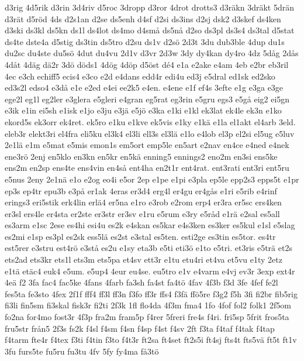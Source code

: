 {{d3rig
4d5rik
d3rin
3d4riv
d5roc
3dropp
d3ror
4drot
drotts3
d3r^^e4kn
3dr^^e4kt
5dr^^e4n
d3r^^e4t
d5r^^f6d
4ds
d2s1an
d2se
ds5enh
d4sf
d2si
ds3ins
d2sj
dsk2
d3skef
ds4ken
d3ski
ds3kl
ds5kn
ds1l
ds4lot
ds4mo
d4sm^^e5
ds5n^^e5
d2so
ds3pl
ds3s4
ds3tal
d5stat
ds4te
dste4a
d5stig
ds3tin
ds5tro
d2su
ds1v
d2s^^f6
2d3t
3du
dub3ble
4dup
du1s
du2sc
du4ste
du5s^^f6
4dut
du4vu
2d1v
d3vr
2d3w
3dy
dy4kan
dy4ro
4dz
5d^^e5g
2d^^e5s
4d^^e5t
4d^^e4g
d^^e42r
3d^^f6
d^^f6ds1
4d^^f6g
4d^^f6p
d5^^f6st
d^^e94
e1a
e2ake
e4am
4eb
e2br
eb3ril
4ec
e3ch
echiff5
ecis4
e3co
e2d
e4dans
edd4r
edi4u
ed3j
e5dral
ed1sk
ed2sko
ed3s2l
edso4
e3d^^e5
e1e
e2ed
e4ei
ee2k5
e4en.
e4ene
e1f
ef4s
3efte
e1g
e3ga
e3ge
ege2l
eg1l
eg2ler
e3glera
e5gleri
e4gran
eg5rat
eg3rin
e5gru
egs3
e5g^^e5
eig2
ei5gn
e3ik
e1in
ei5sh
e1isk
e1jo
e3ju
e3j^^e4
e5j^^f6
e3ka
e1ki
e1kl
ek3lat
ek4le
ek3n
e1ko
ekord5s
ek3orr
ek4ret.
ek5ro
e1ku
e1kve
ek5vis
e1ky
e1k^^e4
e1la
el1akt
el4arb
3eld.
eleb3r
elekt3ri
el4fra
eli5ku
el3k4
el3li
ell3s
el3l^^e4
e1lo
e4lob
el3p
el2si
el5ug
e5luv
2e1l^^e4
e1m
e5mat
e5mis
emon1s
em5ort
emp5le
en5art
e2nav
en4ce
e4ned
e4nek
ene3r^^f6
2enj
en5klo
en3kn
en5kr
en5k^^e4
enning5
ennings2
eno2m
en3si
ens5ke
ens2m
en2sp
ens4te
ens4vin
en4s^^e5
ent4ha
en2t1r
ent4rat.
ent3rati
ent3ri
ent5ru
e5nus
2eny
2e1n^^e4
e1o
e2og
eo4i
e5or
2ep
e1pe
e1pi
e3pla
ep5le
epp2s3
epps5t
e1pr
ep3s
ep4tr
epu3b
e3p^^e5
er1ak
4eras
er3d4
erg4l
er4gu
er4g^^e5s
e1ri
e5rib
e4rinf
erings3
eri5stik
erk4lin
erl^^e44
er5na
e1ro
e3rob
e2rom
erp4
er3ra
er5sc
ers4ken
er3sl
ers4le
er4sta
er2ste
er3str
er3sv
e1ru
e5rum
e3ry
e5r^^e5d
e1r^^e4
e2sal
es5all
es3arm
e1sc
2ese
es4hi
esi4u
es2k
e4skan
es5kar
e4s3ken
es3ker
es5kul
e1sl
e5slag
es2mi
e1sp
es3pl
es2sk
ess5l^^e4
es2st
e3stal
es5ten.
esti2ge
es3tin
es5tor.
es4tr
est5rer
e3stru
est4r^^f6
e3st^^e5
es2u
e1sy
eta3b
e5ti
eti3^^f6
e1to
e5tri.
et3ris
e5tr^^e4
et2s
ets2ad
ets3kr
ets1l
ets3m
ets5pa
et4sv
ett3r
e1tu
etu4ri
et4va
et5vu
e1ty
2etz
e1t^^e4
et^^e4c4
euk4
e5um.
e5up4
4eur
eu4se.
eu5tro
e1v
e4varm
e4vj
ev3r
3exp
ext4r
4e^^e4
f2
3fa
fac4
fac5ke
4fans
4farb
fa3sh
fa4st
fa4t^^f6
4fav
4f3b
f3d
3fe
4fef
fe2l
fes5ta
fe3sto
4fex
2f1f
fff4
ff3l
ff3n
f3fo
ff3r
ffs4
f3f^^e4
ff^^f65re
f3g2
f5h
3fi
fi2br
fib5rig
fi3li
fin5sm
fi3skal
fisk3r
fi2ti
2f3k
1fl
flo4da
4f3m
fma4
1fo
4fof
fol2
folk1
2f5om
fo2na
for4mo
fost3r
4f3p
fra2m
fram5p
f4rer
5freri
fre4s
f4ri.
fri5sp
5frit
fros5ta
fru5str
fr^^e5n5
2f3s
fs2k
f4sl
f4sm
f4sn
f4sp
f4st
f4sv
2ft
f3ta
f4taf
f4tak
f4tap
f4tarm
fte4r
f4tex
f3ti
f4tin
f3to
f4t3r
ft2sa
ft4set
ft2s5i
ft4sj
fts4t
fts5v^^e4
ft5t
ft1v
3fu
furs5te
fu5ru
fu3tu
4fv
5fy
fy4ma
f^^e53t^^f6
}}
